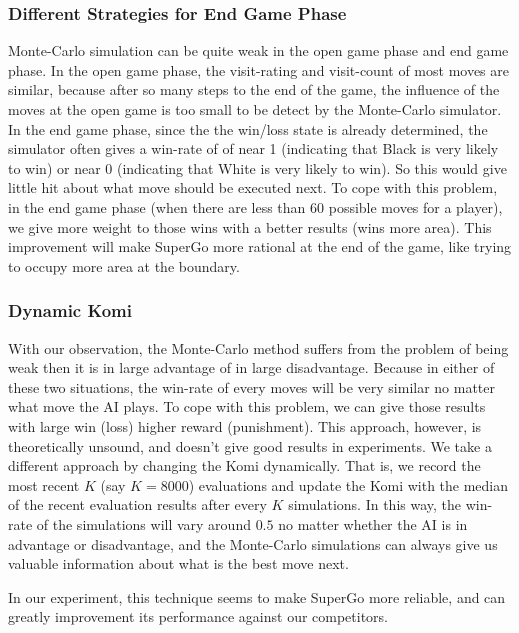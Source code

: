\subsubsection{Different Strategies for End Game Phase}
Monte-Carlo simulation can be quite weak in the open game phase and end game phase. In the open game phase, the visit-rating and visit-count of most moves are similar, because after so many steps to the end of the game, the influence of the moves at the open game is too small to be detect by the Monte-Carlo simulator. In the end game phase, since the the win/loss state is already determined, the simulator often gives a win-rate of of near 1 (indicating that Black is very likely to win) or near 0 (indicating that White is very likely to win). So this would give little hit about what move should be executed next. To cope with this problem, in the end game phase (when there are less than 60 possible moves for a player), we give more weight to those wins with a better results (wins more area). This improvement will make SuperGo more rational at the end of the game, like trying to occupy more area at the boundary.

\subsubsection{Dynamic Komi}
With our observation, the Monte-Carlo method suffers from the problem of being weak then it is in large advantage of in large disadvantage. Because in either of these two situations, the win-rate of every moves will be very similar no matter what move the AI plays. To cope with this problem, we can give those results with large win (loss) higher reward (punishment). This approach, however, is theoretically unsound, and doesn't give good results in experiments. We take a different approach by changing the Komi dynamically. That is, we record the most recent $K$ (say $K=8000$) evaluations and update the Komi with the median of the recent evaluation results after every $K$ simulations. In this way, the win-rate of the simulations will vary around $0.5$ no matter whether the AI is in advantage or disadvantage, and the Monte-Carlo simulations can always give us valuable information about what is the best move next.

In our experiment, this technique seems to make SuperGo more reliable, and can greatly improvement its performance against our competitors.





